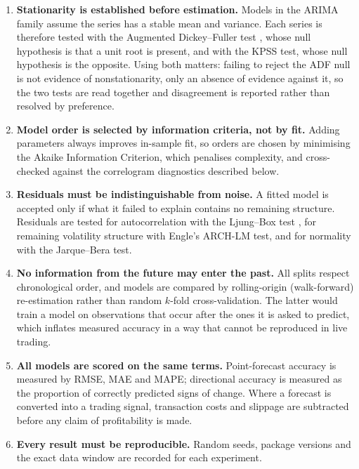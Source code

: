 \documentclass[12pt,a4paper]{article}
\begin{document}
\begin{enumerate}

\item \textbf{Stationarity is established before estimation.} Models in the
ARIMA family assume the series has a stable mean and variance. Each series is
therefore tested with the Augmented Dickey--Fuller test \cite{Dickey_1979},
whose null hypothesis is that a unit root is present, and with the KPSS test,
whose null hypothesis is the opposite. Using both matters: failing to reject
the ADF null is not evidence of nonstationarity, only an absence of evidence
against it, so the two tests are read together and disagreement is reported
rather than resolved by preference.

\item \textbf{Model order is selected by information criteria, not by fit.}
Adding parameters always improves in-sample fit, so orders are chosen by
minimising the Akaike Information Criterion, which penalises complexity, and
cross-checked against the correlogram diagnostics described below.

\item \textbf{Residuals must be indistinguishable from noise.} A fitted model
is accepted only if what it failed to explain contains no remaining
structure. Residuals are tested for autocorrelation with the Ljung--Box test
\cite{Ljung_1978}, for remaining volatility structure with Engle's ARCH-LM
test, and for normality with the Jarque--Bera test.

\item \textbf{No information from the future may enter the past.} All splits
respect chronological order, and models are compared by rolling-origin
(walk-forward) re-estimation rather than random $k$-fold cross-validation. The
latter would train a model on observations that occur after the ones it is
asked to predict, which inflates measured accuracy in a way that cannot be
reproduced in live trading.

\item \textbf{All models are scored on the same terms.} Point-forecast
accuracy is measured by RMSE, MAE and MAPE; directional accuracy is measured
as the proportion of correctly predicted signs of change. Where a forecast is
converted into a trading signal, transaction costs and slippage are subtracted
before any claim of profitability is made.

\item \textbf{Every result must be reproducible.} Random seeds, package
versions and the exact data window are recorded for each experiment.

\end{enumerate}
\end{document}
